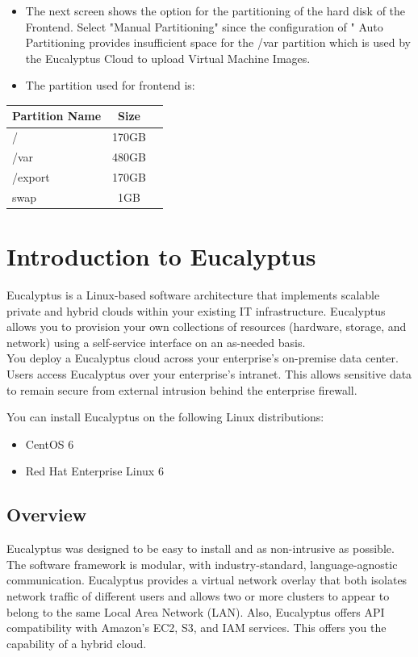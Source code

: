 \begin{itemize}
\item The next screen shows the option for the partitioning of the hard disk of the Frontend. Select "Manual Partitioning" since the configuration of " Auto Partitioning provides insufficient space for the /var partition which is used by the Eucalyptus Cloud to upload Virtual Machine Images.

\item The partition used for frontend is: \\ 
\end{itemize}

\begin{center}
\begin{tabular}{ | l | c | r |}
    \hline
    Partition Name & Size  \\ \hline
    /&170GB \\ 
    /var&480GB \\
	/export&170GB \\
	swap&1GB    \\
    \hline
  \end{tabular}
\end{center}

\chapter{Introduction to Eucalyptus}

Eucalyptus is a Linux-based software architecture that implements scalable private and hybrid clouds within your existing IT infrastructure. Eucalyptus allows you to provision your own collections of resources (hardware, storage, and network) using a self-service interface on an as-needed basis. \linebreak
\\
You deploy a Eucalyptus cloud across your enterprise’s on-premise data center. Users access Eucalyptus over your enterprise's intranet. This allows sensitive data to remain secure from external intrusion behind the enterprise firewall.
\linebreak

You can install Eucalyptus on the following Linux distributions:
\begin{itemize}
\item CentOS 6
\item Red Hat Enterprise Linux 6
\end{itemize}

\section{Overview}
Eucalyptus was designed to be easy to install and as non-intrusive as possible. The software framework is modular, with industry-standard, language-agnostic communication. Eucalyptus provides a virtual network overlay that both isolates network traffic of different users and allows two or more clusters to appear to belong to the same Local Area Network (LAN). Also, Eucalyptus offers API compatibility with Amazon’s EC2, S3, and IAM services. This offers you the capability of a hybrid cloud.

